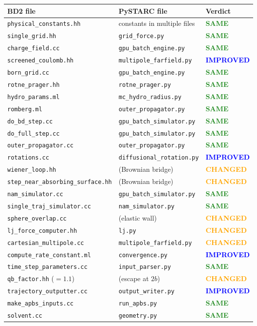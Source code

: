 \documentclass[11pt]{article}
\newcommand{\same}{\textcolor{ForestGreen}{\textbf{SAME}}}
\newcommand{\improved}{\textcolor{Blue}{\textbf{IMPROVED}}}
\newcommand{\changed}{\textcolor{Orange}{\textbf{CHANGED}}}
\begin{document}
\begin{longtable}{p{5.5cm}p{5.5cm}l}
\toprule
\textbf{BD2 file} & \textbf{PySTARC file} & \textbf{Verdict} \\
\midrule
\endhead
\texttt{physical\_constants.hh} & constants in multiple files & \same \\
\texttt{single\_grid.hh} & \texttt{grid\_force.py} & \same \\
\texttt{charge\_field.cc} & \texttt{gpu\_batch\_engine.py} & \same \\
\texttt{screened\_coulomb.hh} & \texttt{multipole\_farfield.py} & \improved \\
\texttt{born\_grid.cc} & \texttt{gpu\_batch\_engine.py} & \same \\
\texttt{rotne\_prager.hh} & \texttt{rotne\_prager.py} & \same \\
\texttt{hydro\_params.ml} & \texttt{mc\_hydro\_radius.py} & \same \\
\texttt{romberg.ml} & \texttt{outer\_propagator.py} & \same \\
\texttt{do\_bd\_step.cc} & \texttt{gpu\_batch\_simulator.py} & \same \\
\texttt{do\_full\_step.cc} & \texttt{gpu\_batch\_simulator.py} & \same \\
\texttt{outer\_propagator.cc} & \texttt{outer\_propagator.py} & \same \\
\texttt{rotations.cc} & \texttt{diffusional\_rotation.py} & \improved \\
\texttt{wiener\_loop.hh} & (Brownian bridge) & \changed \\
\texttt{step\_near\_absorbing\_surface.hh} & (Brownian bridge) & \changed \\
\texttt{nam\_simulator.cc} & \texttt{gpu\_batch\_simulator.py} & \same \\
\texttt{single\_traj\_simulator.cc} & \texttt{nam\_simulator.py} & \same \\
\texttt{sphere\_overlap.cc} & (elastic wall) & \changed \\
\texttt{lj\_force\_computer.hh} & \texttt{lj.py} & \changed \\
\texttt{cartesian\_multipole.cc} & \texttt{multipole\_farfield.py} & \changed \\
\texttt{compute\_rate\_constant.ml} & \texttt{convergence.py} & \improved \\
\texttt{time\_step\_parameters.cc} & \texttt{input\_parser.py} & \same \\
\texttt{qb\_factor.hh} ($=1.1$) & (escape at $2b$) & \changed \\
\texttt{trajectory\_outputter.cc} & \texttt{output\_writer.py} & \improved \\
\texttt{make\_apbs\_inputs.cc} & \texttt{run\_apbs.py} & \same \\
\texttt{solvent.cc} & \texttt{geometry.py} & \same \\
\bottomrule
\end{longtable}
\end{document}
